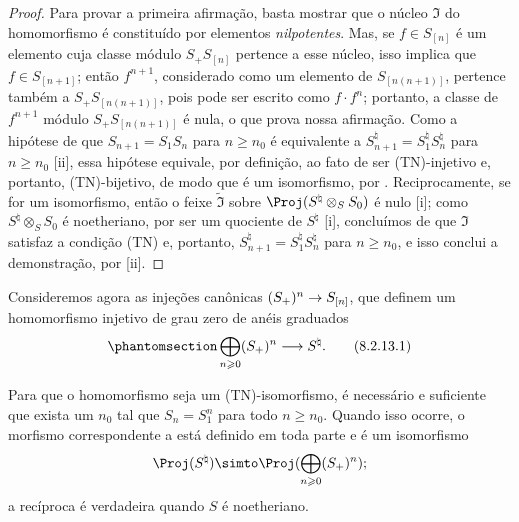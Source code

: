 \documentclass[oneside,10pt]{amsart}
\makeatletter
\renewcommand{\geq}{\geqslant}
\newcommand{\ega@arrow}[2]{\mathchoice{#1}{#2}{#2}{#2}}
\renewcommand{\to}{\ega@arrow{\longrightarrow}{\rightarrow}}
\let\EGAOriginalLabel\label
\renewcommand{\label}[1]{\phantomsection\EGAOriginalLabel{#1}}
\makeatother
\begin{document}
\begin{proof}
Para provar a primeira afirmação, basta  mostrar que o núcleo $\mathfrak{I}$ do homomorfismo  é constituído por elementos \emph{nilpotentes}.
Mas, se $f\in S_{[n]}$ é um elemento cuja classe módulo $S_+S_{[n]}$ pertence a esse núcleo, isso implica que $f\in S_{[n+1]}$;
então $f^{n+1}$, considerado como um elemento de $S_{[n(n+1)]}$, pertence também a $S_+S_{[n(n+1)]}$, pois pode ser escrito como $f\cdot f^n$;
portanto, a classe de $f^{n+1}$ módulo $S_+S_{[n(n+1)]}$ é nula, o que prova nossa afirmação.
Como a hipótese de que $S_{n+1}=S_1S_n$ para $n\geq n_0$ é equivalente a $S_{n+1}^\natural=S_1^\natural S_n^\natural$ para $n\geq n_0$ [ii], essa hipótese equivale, por definição, ao fato de  ser (TN)-injetivo e, portanto, (TN)-bijetivo, de modo que  é um isomorfismo, por .
Reciprocamente, se  for um isomorfismo, então o feixe $\widetilde{\mathfrak{I}}$ sobre $\Proj(S^\natural\otimes_S S_0)$ é nulo [i];
como $S^\natural\otimes_S S_0$ é noetheriano, por ser um quociente de $S^\natural$ [i], concluímos de  que $\mathfrak{I}$ satisfaz a condição (TN) e, portanto, $S_{n+1}^\natural=S_1^\natural S_n^\natural$ para $n\geq n_0$, e isso conclui a demonstração, por [ii].
\end{proof}

\begin{env}[8.2.13]
\label{II.8.2.13}
Consideremos agora as injeções canônicas $(S_+)^n\to S_{[n]}$, que definem um homomorfismo injetivo de grau zero de anéis graduados
\[
\label{II.8.2.13.1}
  \bigoplus_{n\geq0} (S_+)^n \to S^\natural.
\tag{8.2.13.1}
\]
\end{env}

\begin{proposition}[8.2.14]
\label{II.8.2.14}
Para que o homomorfismo  seja um (TN)-isomorfismo, é necessário e suficiente que exista um $n_0$ tal que $S_n=S_1^n$ para todo $n\geq n_0$.
Quando isso ocorre, o morfismo correspondente a  está definido em toda parte e é um isomorfismo
\[
  \Proj(S^\natural) \simto \Proj(\bigoplus_{n\geq0}(S_+)^n);
\]
a recíproca é verdadeira quando $S$ é noetheriano.
\end{proposition}
\end{document}
